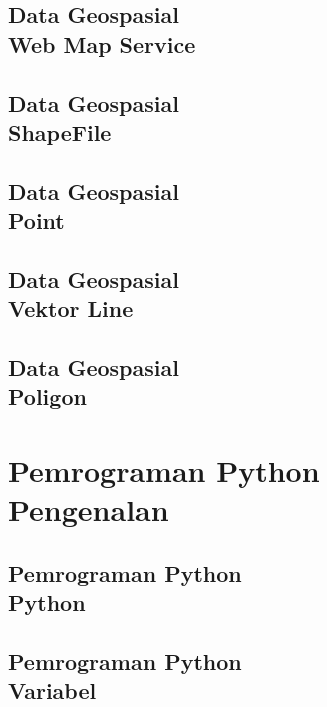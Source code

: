 \documentclass{WileySix}
\begin{document}
%

\chapter[Web Map Service]
{Data Geospasial\\ Web Map Service}



\chapter[Shapefile]
{Data Geospasial\\ ShapeFile}


\chapter[Shapefile Point]
{Data Geospasial\\ Point}


\chapter[Data Vektor Line]
{Data Geospasial\\ Vektor Line}


\chapter[Shapefile Poligon]
{Data Geospasial\\ Poligon}



\part[Pemrograman Python]
{Pemrograman Python\\ Pengenalan}

\chapter[Python]
{Pemrograman Python\\ Python}


\chapter[Variabel]
{Pemrograman Python\\ Variabel}

\end{document}
